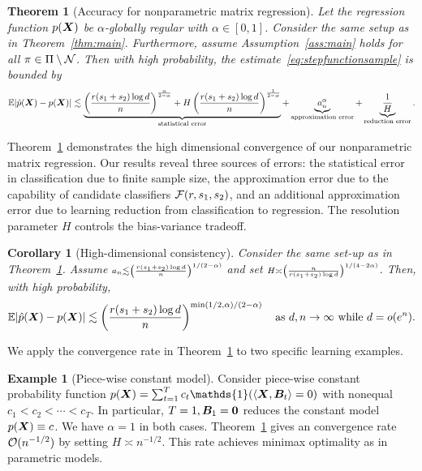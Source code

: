 \documentclass[11pt]{article}
\newcommand*{\KeepStyleUnderBrace}[1]{%
\mathop{%
\mathchoice
{\underbrace{\displaystyle#1}}%
{\underbrace{\textstyle#1}}%
{\underbrace{\scriptstyle#1}}%
{\underbrace{\scriptscriptstyle#1}}%
}\limits
}
\theoremstyle{plain}
\newtheorem{thm}{Theorem}
\newtheorem{corollary}{Corollary}
\theoremstyle{definition}
\newtheorem{example}{Example}
\begin{document}
\begin{thm}[Accuracy for nonparametric matrix regression]\label{thm:regression} Let the regression function $p(\bm X)$ be $\alpha$-globally regular  with $\alpha\in[0,1]$. Consider the same setup as in Theorem~\ref{thm:main}. Furthermore, assume Assumption~\ref{ass:main} holds for all $\pi\in\Pi\setminus \mathcal{N}$. Then with high probability, the estimate~\eqref{eq:stepfunctionsample} is bounded by
\[
\mathbb{E}|\hat p(\mX)- p(\mX)| \lesssim  \KeepStyleUnderBrace{
\left({r(s_1+s_2)\log d\over n}\right)^{\alpha\over 2-\alpha}+H\left({r(s_1+s_2)\log d\over n}\right)^{1\over 2-\alpha}}_{\text{statistical error}} + \KeepStyleUnderBrace{a^\alpha_n}_{\text{approximation error}}+\KeepStyleUnderBrace{{1\over H}}_{\text{reduction error}}.
\]
\end{thm}

Theorem~\ref{thm:regression} demonstrates the high dimensional convergence of our nonparametric matrix regression. Our results reveal three sources of errors: the statistical error in classification due to finite sample size, the approximation error due to the capability of candidate classifiers $\mathcal{F}(r,s_1,s_2)$, and an additional approximation error due to learning reduction from classification to regression. The resolution parameter $H$ controls the bias-variance tradeoff. 

\begin{corollary}[High-dimensional consistency] Consider the same set-up as in Theorem~\ref{thm:regression}. Assume $\scriptstyle a_n \lesssim \left({r(s_1+s_2)\log d \over n}\right)^{1/(2-\alpha)}$ and set $\scriptstyle H\asymp \left({n\over r(s_1+s_2) \log d}\right)^{1/(4-2\alpha)}$. Then, with high probability,
\begin{equation}\label{eq:final}
\mathbb{E}|\hat p(\bm X)- p(\bm X)| \lesssim \left({r(s_1+s_2)\log d \over n}\right)^{\min(1/2,\alpha)/(2-\alpha)} \quad \text{as }d, n\to\infty \text{ while } d=o(e^{n}).
\end{equation}
\end{corollary}
We apply the convergence rate in Theorem~\ref{thm:regression} to two specific learning examples.

\begin{example}[Piece-wise constant model] Consider piece-wise constant probability function $p(\mX)=\sum_{t=1}^T c_t\mathds{1}(\langle \mX, \mB_t \rangle=0)$ with nonequal $c_1< c_2<\cdots < c_T$. In particular, $T=1, \bm B_1=\bm{0}$ reduces the constant model $p(\bm X)\equiv c$. We have $\alpha=1$ in both cases. Theorem~\ref{thm:regression} gives an convergence rate $\mathcal{O}(n^{-1/2})$ by setting $H\asymp n^{-1/2}$. This rate achieves minimax optimality as in parametric models. 
\end{example}
\end{document}
